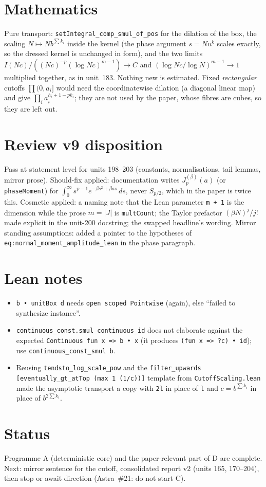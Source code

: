 \documentclass[11pt]{article}
\begin{document}
\section{Mathematics}
Pure transport: \texttt{setIntegral\_comp\_smul\_of\_pos} for the dilation of the box, the scaling
$N\mapsto Nb^{\sum k_i}$ inside the kernel (the phase argument $s=Nu^k$ scales exactly, so the
dressed kernel is unchanged in form), and the two limits
$I(Nc)/((Nc)^{-p}(\log Nc)^{m-1})\to C$ and $(\log Nc/\log N)^{m-1}\to1$ multiplied together, as in
unit~183. Nothing new is estimated. Fixed \emph{rectangular} cutoffs $\prod(0,a_i]$ would need the
coordinatewise dilation (a diagonal linear map) and give $\prod_ia_i^{h_i+1-pk_i}$; they are not used
by the paper, whose fibres are cubes, so they are left out.

\section{Review v9 disposition}
Pass at statement level for units 198--203 (constants, normalisations, tail lemmas, mirror prose).
Should-fix applied: documentation writes $J^{(\beta)}_p(a)$ (or \texttt{phaseMoment}) for
$\int_0^\infty s^{p-1}e^{-\beta s^2+\beta as}\,ds$, never $S_{p/2}$, which in the paper is twice
this. Cosmetic applied: a naming note that the Lean parameter \texttt{m + 1} is the dimension while
the prose $m=|J|$ is \texttt{multCount}; the Taylor prefactor $(\beta N)^j/j!$ made explicit in the
unit-200 docstring; the swapped headline's wording. Mirror standing assumptions: added a pointer to
the hypotheses of \texttt{eq:normal\_moment\_amplitude\_lean} in the phase paragraph.

\section{Lean notes}
\begin{itemize}
\item \texttt{b • unitBox d} needs \texttt{open scoped Pointwise} (again), else ``failed to
  synthesize instance''.
\item \texttt{continuous\_const.smul continuous\_id} does not elaborate against the expected
  \texttt{Continuous fun x => b • x} (it produces \texttt{(fun x => ?c) • id}); use
  \texttt{continuous\_const\_smul b}.
\item Reusing \texttt{tendsto\_log\_scale\_pow} and the \texttt{filter\_upwards [eventually\_gt\_atTop (max 1 (1/c))]}
  template from \texttt{CutoffScaling.lean} made the asymptotic transport a copy with
  \texttt{2l} in place of \texttt{l} and $c=b^{\sum k_i}$ in place of $b^{2\sum k_i}$.
\end{itemize}

\section{Status}
Programme A (deterministic core) and the paper-relevant part of D are complete. Next: mirror
sentence for the cutoff, consolidated report v2 (units 165, 170--204), then stop or await direction
(Astra~\#21: do not start C).
\end{document}

